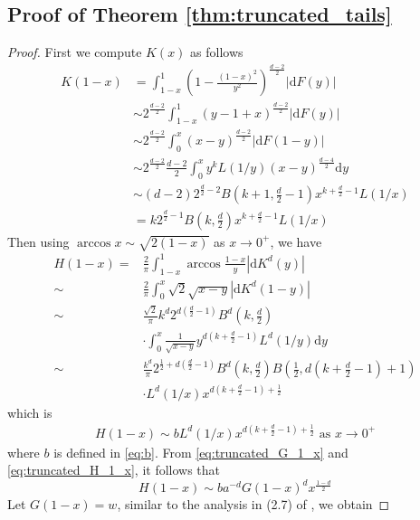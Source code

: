 \documentclass[conference,a4paper]{IEEEtran}
\def\dd{\mathrm{d}}
\begin{document}
\subsection{Proof of Theorem \ref{thm:truncated_tails}}
\begin{proof}
First we compute $K(x)$ as follows
\begin{align*}
    K(1-x)  & = \int_{1-x}^1 \left(1-\frac{(1-x)^2}{y^2}\right)^{\frac{d-2}{2}} |\dd F(y)| \\
    & \sim 2^{\frac{d-2}{2}} \int_{1-x}^1 (y-1+x)^{\frac{d-2}{2}} |\dd F(y)| \\
    & \sim 2^{\frac{d-2}{2}} \int_0^x (x-y)^{\frac{d-2}{2}} |\dd F(1-y)| \\
    & \sim 2^{\frac{d-2}{2}} \frac{d-2}{2} \int_0^x y^k L(1/y) (x-y)^{\frac{d-4}{2}} \dd y\\
    & \sim (d-2)2^{\frac{d}{2}-2} B(k+1,\frac{d}{2}-1)x^{k+\frac{d}{2}-1}L(1/x)\\
    & = k 2^{\frac{d}{2}-1} B(k, \frac{d}{2}) x^{k+\frac{d}{2}-1} L(1/x) 
\end{align*}
Then using $\arccos x \sim \sqrt{2(1-x)}$ as $x\to 0^+$,
we have
\begin{align*}
     H(1-x)  =& \frac{2}{\pi} \int_{1-x}^{1}
     \arccos\frac{1-x}{y}
     |\dd K^d(y)| \\
     \sim& \frac{2}{\pi}\int_0^x \sqrt{2}\sqrt{x-y} |\dd K^d(1-y)| \\
     \sim& \frac{\sqrt{2}}{\pi} k^d
     2^{d(\frac{d}{2}-1)} B^d(k, \frac{d}{2})\\
     &\cdot \int_0^x \frac{1}{\sqrt{x-y}} y^{d(k+\frac{d}{2}-1)} L^d(1/y) \dd y\\
     \sim &\frac{k^d}{\pi}
     2^{\frac{1}{2} + d(\frac{d}{2}-1)} B^d(k, \frac{d}{2})
     B\left( \frac{1}{2},
     d(k+\frac{d}{2} -1)+1 \right) \\
     &\cdot L^d(1/x) x^{d(k+\frac{d}{2}-1)+\frac{1}{2}}
\end{align*}
which is
\begin{align}
     H(1-x)  \sim b
     L^d(1/x) x^{d(k+\frac{d}{2}-1)+\frac{1}{2}} 
     \textrm{ as } x \to 0^+ \label{eq:truncated_H_1_x}
\end{align}
where $b$ is defined in \eqref{eq:b}.
From \eqref{eq:truncated_G_1_x} and \eqref{eq:truncated_H_1_x}, it follows that
\begin{equation}
    H(1-x) \sim ba^{-d} G(1-x)^d x^{\frac{1-d}{2}}
\end{equation}
Let $G(1-x)=w$, similar to the analysis in (2.7) of
\cite{carnal1970konvexe}, we obtain

\end{proof}
\end{document}
